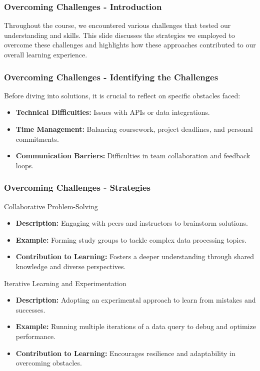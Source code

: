 \documentclass[aspectratio=169]{beamer}
\begin{document}
\begin{frame}[fragile]
    \frametitle{Overcoming Challenges - Introduction}
    Throughout the course, we encountered various challenges that tested our understanding and skills. This slide discusses the strategies we employed to overcome these challenges and highlights how these approaches contributed to our overall learning experience.
\end{frame}

\begin{frame}[fragile]
    \frametitle{Overcoming Challenges - Identifying the Challenges}
    Before diving into solutions, it is crucial to reflect on specific obstacles faced:
    \begin{itemize}
        \item \textbf{Technical Difficulties:} Issues with APIs or data integrations.
        \item \textbf{Time Management:} Balancing coursework, project deadlines, and personal commitments.
        \item \textbf{Communication Barriers:} Difficulties in team collaboration and feedback loops.
    \end{itemize}
\end{frame}

\begin{frame}[fragile]
    \frametitle{Overcoming Challenges - Strategies}
    \begin{block}{Collaborative Problem-Solving}
        \begin{itemize}
            \item \textbf{Description:} Engaging with peers and instructors to brainstorm solutions.
            \item \textbf{Example:} Forming study groups to tackle complex data processing topics.
            \item \textbf{Contribution to Learning:} Fosters a deeper understanding through shared knowledge and diverse perspectives.
        \end{itemize}
    \end{block}

    \begin{block}{Iterative Learning and Experimentation}
        \begin{itemize}
            \item \textbf{Description:} Adopting an experimental approach to learn from mistakes and successes.
            \item \textbf{Example:} Running multiple iterations of a data query to debug and optimize performance.
            \item \textbf{Contribution to Learning:} Encourages resilience and adaptability in overcoming obstacles.
        \end{itemize}
    \end{block}
\end{frame}
\end{document}
